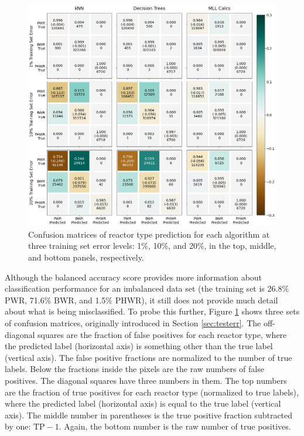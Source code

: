 \begin{figure}[!htb]
  \centering
  \includegraphics[width=\textwidth]{./chapters/exp1/confusion_matrix_nuc29_3errs.png}
  \caption[Confusion matrices of reactor type classification]
          {Confusion matrices of reactor type prediction for each algorithm 
           at three training set error levels: 1\%, 10\%, and 20\%, in the 
           top, middle, and bottom panels, respectively.}
  \label{fig:cm_nuc29}
\end{figure}

Although the balanced accuracy score provides more information about
classification performance for an imbalanced data set (the training set is
26.8\% \gls{PWR}, 71.6\% \gls{BWR}, and 1.5\% \gls{PHWR}), it still does not
provide much detail about what is being misclassified. To probe this further,
Figure \ref{fig:cm_nuc29} shows three sets of confusion matrices, originally
introduced in Section \ref{sec:testerr}.  The off-diagonal squares are the
fraction of false positives for each reactor type, where the predicted label
(horizontal axis) is something other than the true label (vertical axis).
The false positive fractions are normalized to the number of true labels.
Below the fractions inside the pixels are the raw numbers of false positives.
The diagonal squares have three numbers in them. The top numbers are the
fraction of true positives for each reactor type (normalized to true labels),
where the predicted label (horizontal axis) is equal to the true label
(vertical axis).  The middle number in parentheses is the true positive
fraction subtracted by one: $\text{TP} - 1$.  Again, the bottom number is the
raw number of true positives.  

